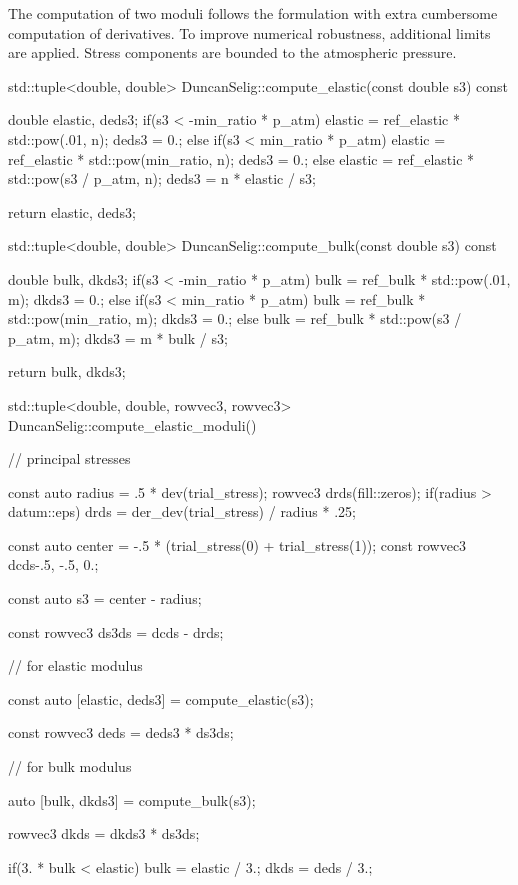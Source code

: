 The computation of two moduli follows the formulation with extra cumbersome computation of derivatives.
To improve numerical robustness, additional limits are applied. Stress components are bounded to the atmospheric pressure.
\begin{cppcode}
std::tuple<double, double> DuncanSelig::compute_elastic(const double s3) const {
    double elastic, deds3;
    if(s3 < -min_ratio * p_atm) {
        elastic = ref_elastic * std::pow(.01, n);
        deds3 = 0.;
    }
    else if(s3 < min_ratio * p_atm) {
        elastic = ref_elastic * std::pow(min_ratio, n);
        deds3 = 0.;
    }
    else {
        elastic = ref_elastic * std::pow(s3 / p_atm, n);
        deds3 = n * elastic / s3;
    }

    return {elastic, deds3};
}

std::tuple<double, double> DuncanSelig::compute_bulk(const double s3) const {
    double bulk, dkds3;
    if(s3 < -min_ratio * p_atm) {
        bulk = ref_bulk * std::pow(.01, m);
        dkds3 = 0.;
    }
    else if(s3 < min_ratio * p_atm) {
        bulk = ref_bulk * std::pow(min_ratio, m);
        dkds3 = 0.;
    }
    else {
        bulk = ref_bulk * std::pow(s3 / p_atm, m);
        dkds3 = m * bulk / s3;
    }

    return {bulk, dkds3};
}

std::tuple<double, double, rowvec3, rowvec3> DuncanSelig::compute_elastic_moduli() {
    // principal stresses

    const auto radius = .5 * dev(trial_stress);
    rowvec3 drds(fill::zeros);
    if(radius > datum::eps) drds = der_dev(trial_stress) / radius * .25;

    const auto center = -.5 * (trial_stress(0) + trial_stress(1));
    const rowvec3 dcds{-.5, -.5, 0.};

    const auto s3 = center - radius;

    const rowvec3 ds3ds = dcds - drds;

    // for elastic modulus

    const auto [elastic, deds3] = compute_elastic(s3);

    const rowvec3 deds = deds3 * ds3ds;

    // for bulk modulus

    auto [bulk, dkds3] = compute_bulk(s3);

    rowvec3 dkds = dkds3 * ds3ds;

    if(3. * bulk < elastic) {
        bulk = elastic / 3.;
        dkds = deds / 3.;
    }

}
\end{cppcode}
